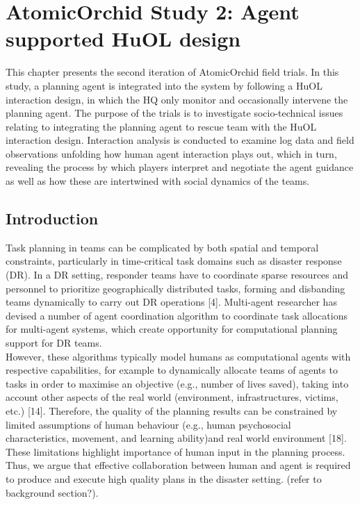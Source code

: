 \chapter{AtomicOrchid Study 2: Agent supported HuOL design}\label{ch:studytwo} %
This chapter presents the second iteration of AtomicOrchid field trials. In this study, a planning agent is integrated into the system by following a HuOL interaction design, in which the HQ only monitor and occasionally intervene the planning agent. The purpose of the trials is to investigate socio-technical issues relating to integrating the planning agent to rescue team with the HuOL interaction design. Interaction analysis is conducted to examine log data and field observations unfolding how human agent interaction plays out, which in turn, revealing the process by which players interpret and negotiate the agent guidance as well as how these are intertwined with social dynamics of the teams.

\section{Introduction}\label{sec:studytwointroduction}
Task planning in teams can be complicated by both spatial and temporal constraints, particularly in time-critical task domains such as disaster response (DR). In a DR setting, responder teams have to coordinate sparse resources and personnel to prioritize geographically distributed tasks, forming and disbanding teams dynamically to carry out DR operations [4]. Multi-agent researcher has devised a number of agent coordination algorithm to coordinate task allocations for multi-agent systems, which create opportunity for computational planning support for DR teams. \\

However, these algorithms typically model humans as computational agents with respective capabilities, for example to dynamically allocate teams of agents to tasks in order to maximise an objective (e.g., number of lives saved), taking into account other aspects of the real world (environment, infrastructures, victims, etc.) [14]. Therefore, the quality of the planning results can be constrained by limited assumptions of human behaviour (e.g., human psychosocial characteristics, movement, and learning ability)and real world environment [18]. These limitations highlight importance of human input in the planning process. Thus, we argue that effective collaboration between human and agent is required to produce and execute high quality plans in the disaster setting. (refer to background section?). \\

